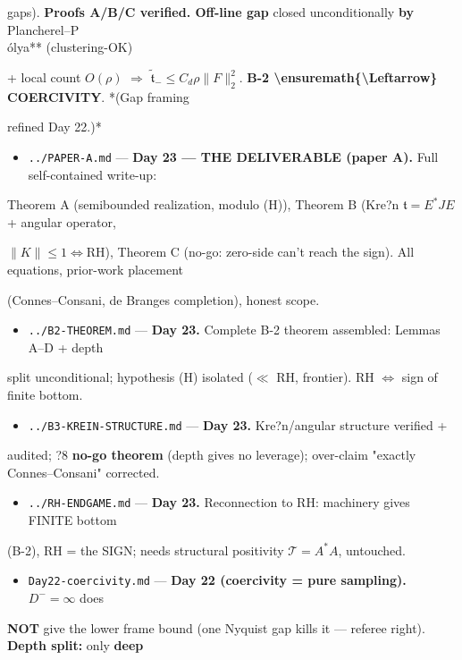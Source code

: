\documentclass[10pt]{article}
\begin{document}
  gaps).\textbf{ Proofs A/B/C verified. Off-line gap }closed unconditionally\textbf{ by }Plancherel--P\\\'olya** (clustering-OK)\par
  + local count $O(\rho)$ \ensuremath{\Rightarrow} $\widetilde{\mathfrak t}_-\le C_d\rho\|F\|_2^2$. \textbf{B-2 \textbackslash{}ensuremath\{\textbackslash{}Leftarrow\} COERCIVITY}. *(Gap framing\par
  refined Day 22.)*\par
\begin{itemize}
\item \texttt{../PAPER-A.md} --- \textbf{Day 23 --- THE DELIVERABLE (paper A).} Full self-contained write-up:
\end{itemize}
  Theorem A (semibounded realization, modulo (H)), Theorem B (Kre?n $\mathfrak t=E^*JE$ + angular operator,\par
  $\|K\|\le1\iff$RH), Theorem C (no-go: zero-side can't reach the sign). All equations, prior-work placement\par
  (Connes--Consani, de Branges completion), honest scope.
\begin{itemize}
\item \texttt{../B2-THEOREM.md} --- \textbf{Day 23.} Complete B-2 theorem assembled: Lemmas A--D + depth
\end{itemize}
  split unconditional; hypothesis (H) isolated (\ensuremath{\ll} RH, frontier). RH \ensuremath{\iff} sign of finite bottom.\par
\begin{itemize}
\item \texttt{../B3-KREIN-STRUCTURE.md} --- \textbf{Day 23.} Kre?n/angular structure verified +
\end{itemize}
  audited; ?8 \textbf{no-go theorem} (depth gives no leverage); over-claim "exactly Connes--Consani" corrected.\par
\begin{itemize}
\item \texttt{../RH-ENDGAME.md} --- \textbf{Day 23.} Reconnection to RH: machinery gives FINITE bottom
\end{itemize}
  (B-2), RH = the SIGN; needs structural positivity $\mathcal T=A^*A$, untouched.\par
\begin{itemize}
\item \texttt{Day22-coercivity.md} --- \textbf{Day 22 (coercivity = pure sampling).} $D^-=\infty$ does
\end{itemize}
  \textbf{NOT} give the lower frame bound (one Nyquist gap kills it --- referee right). \textbf{Depth split:} only \textbf{deep}\par
\end{document}
